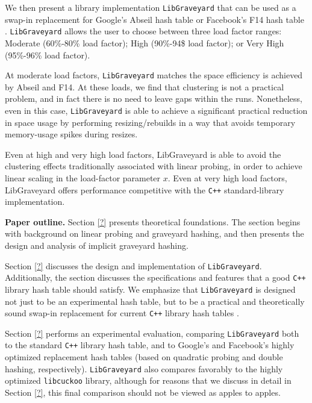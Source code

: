 \documentclass[10pt]{article}
\theoremstyle{remark}
\theoremstyle{remark}
\renewcommand{\paragraph}[1]{\vspace{.2 cm} \noindent \textbf{#1}}
\begin{document}
We then present a library implementation \texttt{LibGraveyard} that can be used as a swap-in replacement for Google's Abseil hash table \cite{??} or Facebook's F14 hash table \cite{??}. \texttt{LibGraveyard} allows the user to choose between three load factor ranges: Moderate (60\%-80\% load factor); High (90\%-94\$ load factor); or Very High (95\%-96\% load factor).

At moderate load factors, \texttt{LibGraveyard} matches the space efficiency is achieved by  Abseil and F14. At these loads, we find that clustering is not a practical problem, and in fact there is no need to leave gaps within the runs. Nonetheless, even in this case, \texttt{LibGraveyard} is able to achieve a significant practical reduction in space usage by performing resizing/rebuilds in a way that avoids temporary memory-usage spikes during resizes.

Even at high and very high load factors, LibGraveyard is able to avoid the clustering effects traditionally associated with linear probing, in order to achieve linear scaling in the load-factor parameter $x$. Even at very high load factors, LibGraveyard offers performance competitive with the \texttt{C++} standard-library implementation. 

\paragraph{Paper outline.}
Section \ref{?} presents theoretical foundations. The section begins with background on linear probing and graveyard hashing, and then presents the design and analysis of implicit graveyard hashing.

Section \ref{?} discusses the design and implementation of \texttt{LibGraveyard}. Additionally, the section discusses the specifications and features that a good \texttt{C++} library hash table should satisfy. We emphasize that \texttt{LibGraveyard} is designed not just to be an experimental hash table, but to be a practical and theoretically sound swap-in replacement for current \texttt{C++} library hash tables \cite{??}.

Section \ref{?} performs an experimental evaluation, comparing \texttt{LibGraveyard} both to the standard \texttt{C++} library hash table, and to Google's and Facebook's highly optimized replacement hash tables (based on quadratic probing and double hashing, respectively). \texttt{LibGraveyard} also compares favorably to the highly optimized \texttt{libcuckoo} library, although for reasons that we discuss in detail in Section \ref{?}, this final comparison should not be viewed as apples to apples. 
\end{document}
